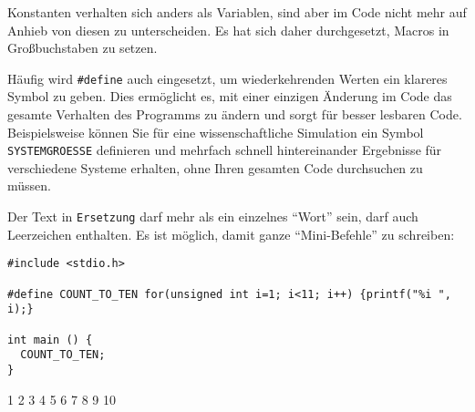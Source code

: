 \begin{hintbox}
Konstanten verhalten sich anders als Variablen, sind aber im Code nicht mehr auf Anhieb von diesen zu unterscheiden. Es hat sich daher durchgesetzt, Macros in Großbuchstaben zu setzen.
\end{hintbox}

Häufig wird \texttt{#define} auch eingesetzt, um wiederkehrenden Werten ein klareres Symbol zu geben. Dies ermöglicht es, mit einer einzigen Änderung im Code das gesamte Verhalten des Programms zu ändern und sorgt \idR für besser lesbaren Code. Beispielsweise können Sie für eine wissenschaftliche Simulation ein Symbol \texttt{SYSTEMGROESSE} definieren und mehrfach schnell hintereinander Ergebnisse für verschiedene Systeme erhalten, ohne Ihren gesamten Code durchsuchen zu müssen.

Der Text in \texttt{Ersetzung} darf mehr als ein einzelnes \enquote{Wort} sein, \ie darf auch Leerzeichen enthalten. Es ist möglich, damit ganze \enquote{Mini-Befehle} zu schreiben:

\begin{codebox}
\begin{verbatim}
#include <stdio.h>

#define COUNT_TO_TEN for(unsigned int i=1; i<11; i++) {printf("%i ", i);}

int main () {
  COUNT_TO_TEN;
}
\end{verbatim}
\end{codebox}

\begin{cmdbox}
1 2 3 4 5 6 7 8 9 10
\end{cmdbox}

